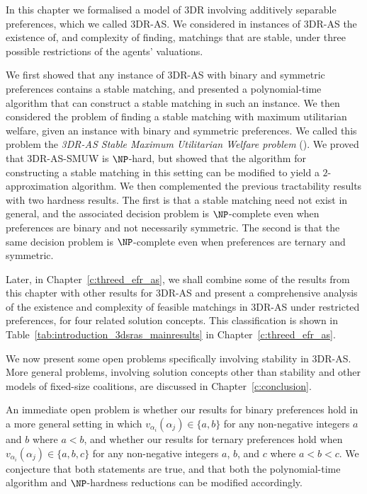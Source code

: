 In this chapter we formalised a model of 3DR involving additively separable preferences, which we called 3DR-AS. We considered in instances of 3DR-AS the existence of, and complexity of finding, matchings that are stable, under three possible restrictions of the agents' valuations. 

We first showed that any instance of 3DR-AS with binary and symmetric preferences contains a stable matching, and presented a polynomial-time algorithm that can construct a stable matching in such an instance. 
We then considered the problem of finding a stable matching with maximum utilitarian welfare, given an instance with binary and symmetric preferences. We called this problem the \emph{3DR-AS Stable Maximum Utilitarian Welfare problem} (). We proved that 3DR-AS-SMUW is $\NP$-hard, but showed that the algorithm for constructing a stable matching in this setting can be modified to yield a $2$-approximation algorithm.  We then complemented the previous tractability results with two hardness results. The first is that a stable matching need not exist in general, and the associated decision problem is $\NP$-complete even when preferences are binary and not necessarily symmetric. The second is that the same decision problem is $\NP$-complete even when preferences are ternary and symmetric. 

Later, in Chapter~\ref{c:threed_efr_as}, we shall combine some of the results from this chapter with other results for 3DR-AS and present a comprehensive analysis of the existence and complexity of feasible matchings in 3DR-AS under restricted preferences, for four related solution concepts. This classification is shown in Table~\ref{tab:introduction_3dsras_mainresults} in Chapter~\ref{c:threed_efr_as}.

We now present some open problems specifically involving stability in 3DR-AS. More general problems, involving solution concepts other than stability and other models of fixed-size coalitions, are discussed in Chapter~\ref{c:conclusion}. 

An immediate open problem is whether our results for binary preferences hold in a more general setting in which $v_{\alpha_i}(\alpha_j) \in \{ a, b \}$ for any non-negative integers $a$ and $b$ where $a < b$, and whether our results for ternary preferences hold when $v_{\alpha_i}(\alpha_j) \in \{ a, b, c \}$ for any non-negative integers $a$, $b$, and $c$ where $a < b < c$. We conjecture that both statements are true, and that both the polynomial-time algorithm and $\NP$-hardness reductions can be modified accordingly.

